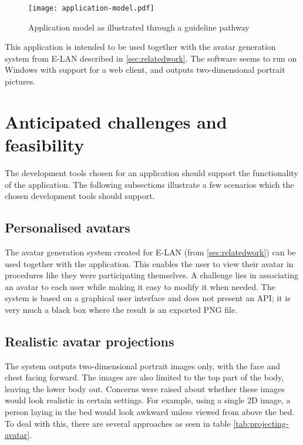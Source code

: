 \begin{figure}
    \centering
    \texttt{[image: application-model.pdf]}
    \caption{Application model as illustrated through a guideline pathway}
    \label{fig:applicationmodel}
\end{figure}

This application is intended to be used together with the avatar generation system from E-LAN described in \cref{sec:relatedwork}.
The software seems to run on Windows with support for a web client, and outputs two-dimensional portrait pictures.

\section{Anticipated challenges and feasibility}
\label{sec:anticipatedchallenges}

The development tools chosen for an application should support the functionality of the application. The following subsections illustrate a few scenarios which the chosen development tools should support.

\subsection{Personalised avatars}

The avatar generation system created for E-LAN (from \ref{sec:relatedwork}) can be used together with the application. This enables the user to view their avatar in procedures like they were participating themselves. A challenge lies in associating an avatar to each user while making it easy to modify it when needed. The system is based on a graphical user interface and does not present an API; it is very much a black box where the result is an exported PNG file.

\subsection{Realistic avatar projections}

The system outputs two-dimensional portrait images only, with the face and chest facing forward. The images are also limited to the top part of the body, leaving the lower body out. Concerns were raised about whether these images would look realistic in certain settings. For example, using a single 2D image, a person laying in the bed would look awkward unless viewed from above the bed. To deal with this, there are several approaches as seen in table \ref{tab:projecting-avatar}.

